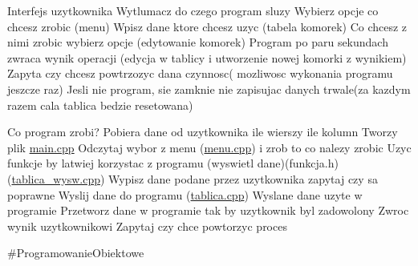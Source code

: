 Interfejs uzytkownika Wytlumacz do czego program sluzy Wybierz opcje co chcesz zrobic (menu) Wpisz dane ktore chcesz uzyc (tabela komorek) Co chcesz z nimi zrobic wybierz opcje (edytowanie komorek) Program po paru sekundach zwraca wynik operacji (edycja w tablicy i utworzenie nowej komorki z wynikiem) Zapyta czy chcesz powtrzozyc dana czynnosc( mozliwosc wykonania programu jeszcze raz) Jesli nie program, sie zamknie nie zapisujac danych trwale(za kazdym razem cala tablica bedzie resetowana)

Co program zrobi? Pobiera dane od uzytkownika ile wierszy ile kolumn Tworzy plik \mbox{\hyperlink{main_8cpp}{main.\+cpp}} Odczytaj wybor z menu (\mbox{\hyperlink{menu_8cpp}{menu.\+cpp}}) i zrob to co nalezy zrobic Uzyc funkcje by latwiej korzystac z programu (wyswietl dane)(funkcja.\+h)(\mbox{\hyperlink{tablica__wysw_8cpp}{tablica\+\_\+wysw.\+cpp}}) Wypisz dane podane przez uzytkownika zapytaj czy sa poprawne Wyslij dane do programu (\mbox{\hyperlink{tablica_8cpp}{tablica.\+cpp}}) Wyslane dane uzyte w programie Przetworz dane w programie tak by uzytkownik byl zadowolony Zwroc wynik uzytkownikowi Zapytaj czy chce powtorzyc proces

\#\+Programowanie\+Obiektowe 